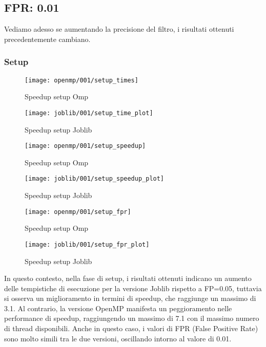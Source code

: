 \subsection{FPR: 0.01}\label{subsec:fpr-001}
Vediamo adesso se aumentando la precisione del filtro, i risultati ottenuti precedentemente cambiano.

\subsubsection{Setup}\label{subsubsec:setup}
\begin{figure}[H]
    \centering
    \texttt{[image: openmp/001/setup\_times]}
        \caption{Speedup setup Omp}\label{fig:setup_time_omp}
    \endminipage\hfill
    \texttt{[image: joblib/001/setup\_time\_plot]}
        \caption{Speedup setup Joblib}\label{fig:setup_time_joblib}
    \endminipage\hfill
\end{figure}
\begin{figure}[H]
    \centering
    \texttt{[image: openmp/001/setup\_speedup]}
        \caption{Speedup setup Omp}\label{fig:setup_speedup_omp}
    \endminipage\hfill
    \texttt{[image: joblib/001/setup\_speedup\_plot]}
        \caption{Speedup setup Joblib}\label{fig:setup_speedup_joblib}
    \endminipage\hfill
\end{figure}
\begin{figure}[H]
    \centering
    \texttt{[image: openmp/001/setup\_fpr]}
        \caption{Speedup setup Omp}\label{fig:setup_fpr_omp}
    \endminipage\hfill
    \texttt{[image: joblib/001/setup\_fpr\_plot]}
        \caption{Speedup setup Joblib}\label{fig:setup_fpr_joblib}
    \endminipage\hfill
\end{figure}

In questo contesto, nella fase di setup,
i risultati ottenuti indicano un aumento delle tempistiche di esecuzione per la versione Joblib
rispetto a FP=0.05, tuttavia si osserva un miglioramento in termini di speedup, che raggiunge un massimo di 3.1.
Al contrario, la versione OpenMP manifesta un peggioramento nelle performance di speedup,
raggiungendo un massimo di 7.1 con il massimo numero di thread disponibili.
Anche in questo caso, i valori di FPR (False Positive Rate) sono molto simili tra le due versioni, oscillando intorno
al valore di 0.01.

